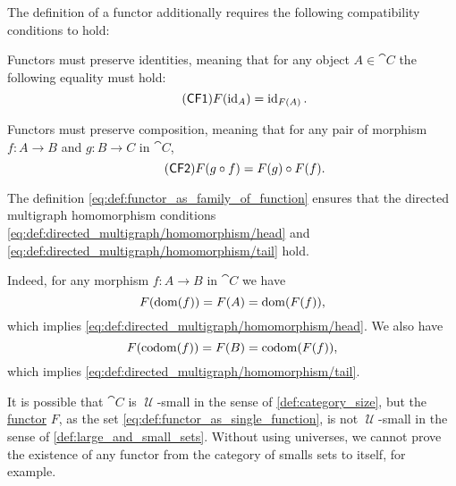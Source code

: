 \begin{definition}
  The definition of a functor additionally requires the following compatibility conditions to hold:
  \begin{thmenum}[series=def:functor]
     Functors must preserve identities, meaning that for any object \( A \in \cat{C} \) the following equality must hold:
    \begin{equation}\label{eq:def:functor/CF1}\tag{\logic{CF1}}
      F(\id_A) = \id_{F(A)}.
    \end{equation}

     Functors must preserve composition, meaning that for any pair of morphism \( f: A \to B \) and \( g: B \to C \) in \( \cat{C} \),
    \begin{equation}\label{eq:def:functor/CF2}\tag{\logic{CF2}}
      F(g \bincirc f) = F(g) \bincirc F(f).
    \end{equation}
  \end{thmenum}
\end{definition}
\begin{defproof}
  The definition \eqref{eq:def:functor_as_family_of_function} ensures that the directed multigraph homomorphism conditions \eqref{eq:def:directed_multigraph/homomorphism/head} and \eqref{eq:def:directed_multigraph/homomorphism/tail} hold.

  Indeed, for any morphism \( f: A \to B \) in \( \cat{C} \) we have
  \begin{equation*}
    F(\operatorname{dom}(f)) = F(A) = \operatorname{dom}(F(f)),
  \end{equation*}
  which implies \eqref{eq:def:directed_multigraph/homomorphism/head}. We also have
  \begin{equation*}
    F(\operatorname*{co\negthinspace\operatorname{dom}}(f)) = F(B) = \operatorname*{co\negthinspace\operatorname{dom}}(F(f)),
  \end{equation*}
  which implies \eqref{eq:def:directed_multigraph/homomorphism/tail}.
\end{defproof}

\begin{remark}\label{rem:functor_size}
  It is possible that \( \cat{C} \) is \( \mscrU \)-small in the sense of \cref{def:category_size}, but the \hyperref[def:functor]{functor} \( F \), as the set \eqref{eq:def:functor_as_single_function}, is not \( \mscrU \)-small in the sense of \cref{def:large_and_small_sets}. Without using universes, we cannot prove the existence of any functor from the category of smalls sets to itself, for example.
\end{remark}

